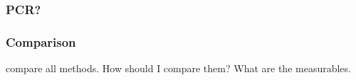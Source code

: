 \subsubsection{PCR?}

\fi

\subsubsection{Comparison} 
compare all methods. 
How should I compare them? 
What are the measurables. 

